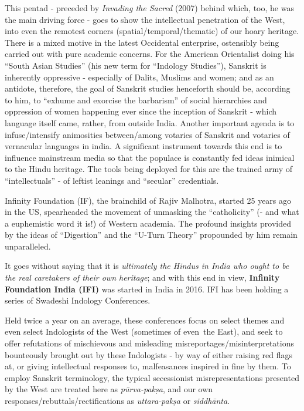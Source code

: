 This pentad - preceded by {\sl Invading the Sacred} (2007) behind which, too, he was the main driving force - goes to show the intellectual penetration of the West, into even the remotest corners (spatial/temporal/\break thematic) of our hoary heritage. There is a mixed motive in the latest Occidental enterprise,  ostensibly being carried out with pure academic concerns. For the American Orientalist doing his ``South Asian Studies'' (his new term for “Indology Studies”), Sanskrit is inherently oppressive - especially of Dalits, Muslims and women; and as an antidote, therefore, the goal of Sanskrit studies henceforth should be, according to him, to ``exhume and exorcise the barbarism'' of social hierarchies and oppression of women happening ever since the inception of Sanskrit - which language itself came, rather, from outside India. Another important agenda is to infuse/intensify animosities between/among votaries of Sanskrit and votaries of vernacular languages in india. A significant instrument towards this end is to influence mainstream media so that the populace is constantly fed ideas inimical to the Hindu heritage. The tools being deployed for this are the trained army of “intellectuals” - of leftist leanings and “secular” credentials.
\vskip 1.5pt

Infinity Foundation (IF), the brainchild of Rajiv Malhotra, started 25 years ago in the US, spearheaded the movement of unmasking the “catholicity” (- and what a euphemistic word it is!) of Western academia. The profound insights provided by the ideas of ``Digestion'' and the “U-Turn Theory” propounded by him remain unparalleled.
\vskip 1.5pt

It goes without saying that it is {\sl ultimately the Hindus in India who ought to be the real caretakers of their own heritage}; and with this end in view, {\bf Infinity Foundation India (IFI)} was started in India in 2016. IFI has been holding a series of Swadeshi Indology Conferences. 
\vskip 1.5pt

Held twice a year on an average, these conferences focus on select themes and even select Indologists of the West (sometimes of even~the East), and seek to offer refutations of mischievous  and misleading misreportages/misinterpretations bounteously brought out by these Indologists - by way of either raising red flags at, or giving intellectual responses to, malfeasances inspired in fine by them. To employ Sanskrit terminology, the typical secessionist misrepresentations presented by the West are treated here as {\sl pūrva-pakṣa}, and our own responses/rebuttals/rectifications as {\sl uttara-pakṣa} or {\sl siddhānta}. 

